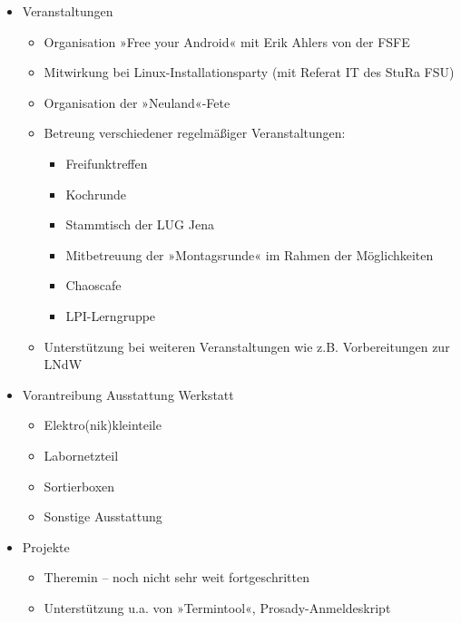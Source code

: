 \documentclass[10pt,DIV16]{scrartcl}
\begin{document}
\begin{itemize}
\begin{itemize}
			\item Referat IT des StuRa FSU Jena
			\item Piratenpartei Jena
			\item Interview mit Akrützel zum Krautspace
			\item Pflege von Twitter und idendi.ca\footnote{Bis zur Umstellung auf neue Software}
			\item Terminvorschaumails auf Mailingliste
			\item Vorstellung des Krautspace beim brmlab\footnote{\url{http://brmlab.cz}} in Prag
		\end{itemize}
	\item Veranstaltungen
		\begin{itemize}
			\item Organisation »Free your Android« mit Erik Ahlers von der FSFE
			\item Mitwirkung bei Linux-Installationsparty (mit Referat IT des StuRa FSU)
			\item Organisation der »Neuland«-Fete
			\item Betreung verschiedener regelmäßiger Veranstaltungen:
				\begin{itemize}
					\item Freifunktreffen
					\item Kochrunde
					\item Stammtisch der LUG Jena
					\item Mitbetreuung der »Montagsrunde« im Rahmen der Möglichkeiten
					\item Chaoscafe
					\item LPI-Lerngruppe
				\end{itemize}
			\item Unterstützung bei weiteren Veranstaltungen wie z.B. Vorbereitungen zur LNdW
		\end{itemize}
	\item Vorantreibung Ausstattung Werkstatt
		\begin{itemize}
			\item Elektro(nik)kleinteile
			\item Labornetzteil
			\item Sortierboxen
			\item Sonstige Ausstattung
		\end{itemize}
	\item Projekte
		\begin{itemize}
			\item Theremin -- noch nicht sehr weit fortgeschritten
			\item Unterstützung u.a. von »Termintool«, Prosady-Anmeldeskript

\end{itemize}
\end{itemize}
\end{document}
